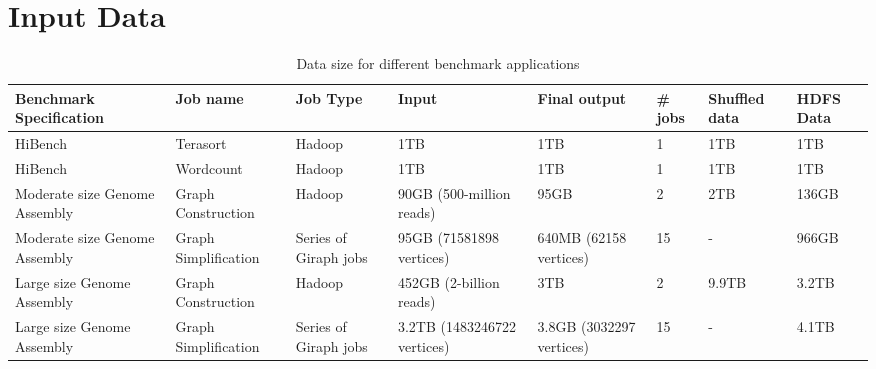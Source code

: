 \documentclass[journal]{IEEEtran}
\begin{document}
\section{Input Data}
\begin{table}
\begin{center}
    \begin{tabular}{ |p{1.1cm} | p{1.1cm} | p{0.8cm} | p{1.1cm} | p{0.8cm} | p{0.5cm} | p{0.8cm} | p{0.8cm}|} \hline
    Benchmark Specification & Job name & Job Type & Input & Final output & \# jobs & Shuffled data & HDFS Data \\ \hline
    HiBench & Terasort & Hadoop & 1TB & 1TB & 1 & 1TB & 1TB  \\ \hline
    HiBench & Wordcount & Hadoop & 1TB & 1TB & 1 & 1TB & 1TB  \\ \hline 
    Moderate size Genome Assembly & Graph Construction  & Hadoop & 90GB (500-million reads) & 95GB & 2 & 2TB & 136GB \\ \hline
    Moderate size Genome Assembly & Graph Simplification & Series of Giraph jobs & 95GB (71581898 vertices) & 640MB (62158 vertices) & 15 & - & 966GB \\ \hline    
    Large size Genome Assembly & Graph Construction & Hadoop & 452GB (2-billion reads) & 3TB & 2 & 9.9TB & 3.2TB \\ \hline
    Large size Genome Assembly & Graph Simplification & Series of Giraph jobs & 3.2TB (1483246722 vertices) & 3.8GB (3032297 vertices) & 15 & - & 4.1TB \\ \hline 
    \end{tabular}
    \caption{Data size for different benchmark applications}
	\label{table:BumbleBeeData}
\end{center}
\end{table}

%
%
\end{document}
